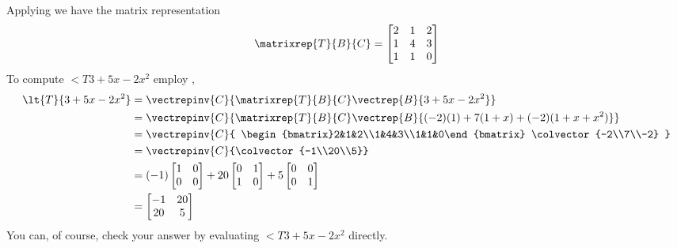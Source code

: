 %
Applying  we have the matrix representation
%
\begin{equation*}
\matrixrep{T}{B}{C}=
\begin{bmatrix}2 & 1  & 2 \\ 1 & 4 & 3 \\ 1 & 1 & 0 \end{bmatrix}
\end{equation*}
%
To compute $\lt{T}{3+5x-2x^2}$ employ ,
%
\begin{align*}
\lt{T}{3+5x-2x^2}&=
\vectrepinv{C}{\matrixrep{T}{B}{C}\vectrep{B}{3+5x-2x^2}}\\
%
&=\vectrepinv{C}{\matrixrep{T}{B}{C}\vectrep{B}{(-2)(1)+7(1+x)+(-2)(1+x+x^2)}}\\
%
&=\vectrepinv{C}{
\begin{bmatrix}2&1&2\\1&4&3\\1&1&0\end{bmatrix}
\colvector{-2\\7\\-2}
}\\
%
&=\vectrepinv{C}{\colvector{-1\\20\\5}}\\
%
&=
(-1)\begin{bmatrix}1 & 0 \\ 0 & 0\end{bmatrix}+
20\begin{bmatrix}0 & 1 \\ 1 & 0\end{bmatrix}+
5\begin{bmatrix}0 & 0 \\ 0 & 1\end{bmatrix}\\
%
&=
\begin{bmatrix}-1 & 20 \\ 20 & 5\end{bmatrix}
%
\end{align*}
%
You can, of course, check your answer by evaluating $\lt{T}{3+5x-2x^2}$ directly.